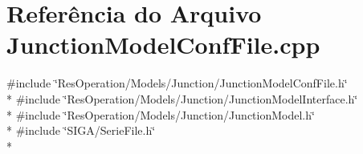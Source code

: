 \section{Referência do Arquivo Junction\+Model\+Conf\+File.\+cpp}
\label{_junction_model_conf_file_8cpp}
{\ttfamily \#include \char`\"{}Res\+Operation/\+Models/\+Junction/\+Junction\+Model\+Conf\+File.\+h\char`\"{}}\\*
{\ttfamily \#include \char`\"{}Res\+Operation/\+Models/\+Junction/\+Junction\+Model\+Interface.\+h\char`\"{}}\\*
{\ttfamily \#include \char`\"{}Res\+Operation/\+Models/\+Junction/\+Junction\+Model.\+h\char`\"{}}\\*
{\ttfamily \#include \char`\"{}S\+I\+G\+A/\+Serie\+File.\+h\char`\"{}}\\*

